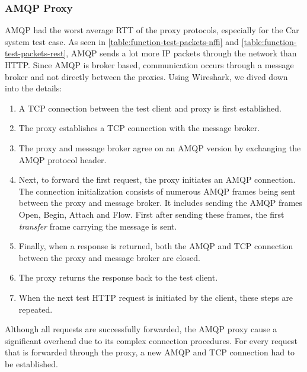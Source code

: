 \subsubsection{AMQP Proxy}

AMQP had the worst average RTT of the proxy protocols, especially for the Car
system test case. As seen in \cref{table:function-test-packets-nffi} and
\cref{table:function-test-packets-rest}, AMQP sends a lot more IP packets
through the network than HTTP. Since AMQP is broker based, communication occurs
through a message broker and not directly between the proxies. Using Wireshark,
we dived down into the details:

\begin{enumerate}

	\item A TCP connection between the test client and  proxy is first established.

    \item The proxy establishes a TCP connection with the message broker.

    \item The proxy and message broker agree on an AMQP version by exchanging
    the AMQP protocol header.

	 \item Next, to forward the first request, the proxy initiates an AMQP
	 connection. The connection initialization consists of numerous AMQP frames
	 being sent between the proxy and message broker. It includes sending the
	 AMQP frames Open, Begin, Attach and Flow.  First after sending these frames,
	 the first \textit{transfer} frame carrying the message is sent.

     \item Finally, when a response is returned, both the AMQP and TCP connection
     between the proxy and message broker are closed.

     \item The proxy returns the response back to the test client.

     \item When the next test HTTP request is initiated by the client, these
     steps are repeated.

\end{enumerate}

Although all requests are successfully forwarded, the AMQP proxy cause a
significant overhead due to its complex connection procedures. For every request
that is forwarded through the proxy, a new AMQP and TCP connection had to be
established.

